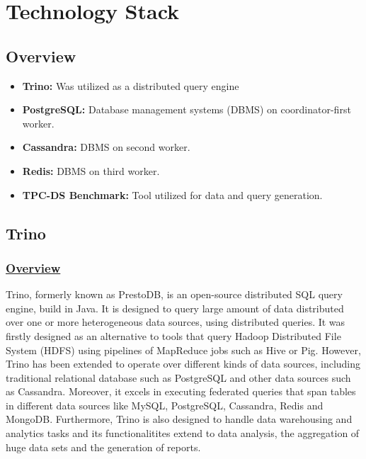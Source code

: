 \documentclass[conference]{IEEEtran}
\begin{document}
\section{Technology Stack}

\subsection{Overview}

\begin{itemize}
    \item \textbf{Trino:} Was utilized as a distributed query engine
    \item \textbf{PostgreSQL:} Database management systems (DBMS) on coordinator-first worker.
    \item \textbf{Cassandra:} DBMS on second worker.
    \item \textbf{Redis:} DBMS on third worker.
    \item \textbf{TPC-DS Benchmark:} Tool utilized for data and query generation.
\end{itemize}

\subsection{Trino}

\subsubsection{\textbf{\underline{Overview}}}
Trino, formerly known as PrestoDB, is an open-source distributed SQL query engine, build in Java. It is designed to query large amount of data
distributed over one or more heterogeneous data sources, using distributed queries. It was firstly designed as an alternative to tools that query 
Hadoop Distributed File System (HDFS) using pipelines of MapReduce jobs such as Hive or Pig. However, Trino has been extended to operate over different 
kinds of data sources, including traditional relational database such as PostgreSQL and other data sources such as Cassandra. Moreover, it excels in
executing federated queries that span tables in different data sources like MySQL, PostgreSQL, Cassandra, Redis and MongoDB. Furthermore, Trino is 
also designed to handle data warehousing and analytics tasks and its functionalitites extend to data analysis, the aggregation of huge data sets and the generation of reports.
\end{document}
